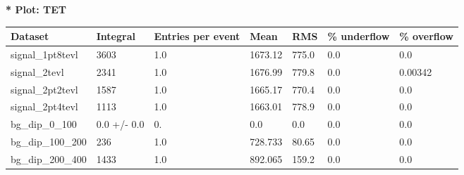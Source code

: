 \documentclass[a4paper, 10pt]{article}
\begin{document}
\textbf{* Plot: TET}\\
   \begin{table}[H]
  \begin{center}
    \begin{tabular}{|m{23.0mm}|m{23.0mm}|m{18.0mm}|m{19.0mm}|m{19.0mm}|m{19.0mm}|m{19.0mm}|}
      \hline
      {\cellcolor{yellow}         Dataset}& {\cellcolor{yellow}         Integral}& {\cellcolor{yellow}         Entries per event}& {\cellcolor{yellow}         Mean}& {\cellcolor{yellow}         RMS}& {\cellcolor{yellow}         \% underflow}& {\cellcolor{yellow}         \% overflow}\\
      \hline
      {\cellcolor{white}         signal\_1pt8tevl}& {\cellcolor{white}         3603}& {\cellcolor{white}         1.0}& {\cellcolor{white}         1673.12}& {\cellcolor{white}         775.0}& {\cellcolor{green}         0.0}& {\cellcolor{green}         0.0}\\
      \hline
      {\cellcolor{white}         signal\_2tevl}& {\cellcolor{white}         2341}& {\cellcolor{white}         1.0}& {\cellcolor{white}         1676.99}& {\cellcolor{white}         779.8}& {\cellcolor{green}         0.0}& {\cellcolor{green}         0.00342}\\
      \hline
      {\cellcolor{white}         signal\_2pt2tevl}& {\cellcolor{white}         1587}& {\cellcolor{white}         1.0}& {\cellcolor{white}         1665.17}& {\cellcolor{white}         770.4}& {\cellcolor{green}         0.0}& {\cellcolor{green}         0.0}\\
      \hline
      {\cellcolor{white}         signal\_2pt4tevl}& {\cellcolor{white}         1113}& {\cellcolor{white}         1.0}& {\cellcolor{white}         1663.01}& {\cellcolor{white}         778.9}& {\cellcolor{green}         0.0}& {\cellcolor{green}         0.0}\\
      \hline
      {\cellcolor{white}         bg\_dip\_0\_100}& {\cellcolor{white}         0.0 +/\-- 0.0}& {\cellcolor{white}         0.}& {\cellcolor{white}         0.0}& {\cellcolor{white}         0.0}& {\cellcolor{green}         0.0}& {\cellcolor{green}         0.0}\\
      \hline
      {\cellcolor{white}         bg\_dip\_100\_200}& {\cellcolor{white}         236}& {\cellcolor{white}         1.0}& {\cellcolor{white}         728.733}& {\cellcolor{white}         80.65}& {\cellcolor{green}         0.0}& {\cellcolor{green}         0.0}\\
      \hline
      {\cellcolor{white}         bg\_dip\_200\_400}& {\cellcolor{white}         1433}& {\cellcolor{white}         1.0}& {\cellcolor{white}         892.065}& {\cellcolor{white}         159.2}& {\cellcolor{green}         0.0}& {\cellcolor{green}         0.0}\\

\end{tabular}
\end{center}
\end{table}
\end{document}
